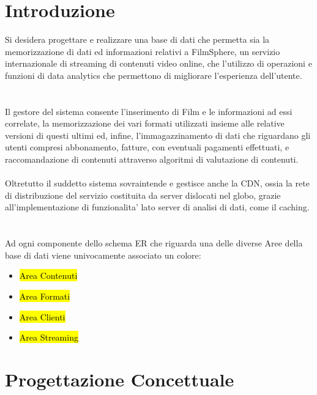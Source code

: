 \documentclass{article}
\begin{document}
\section{Introduzione} 
Si desidera progettare e realizzare una base di dati che permetta sia la memorizzazione di dati ed informazioni relativi a FilmSphere, un servizio internazionale di streaming di contenuti video online, che l'utilizzo di operazioni e funzioni di data analytics che permettono di migliorare l'esperienza dell'utente. \\ \\ \\
Il gestore del sistema consente l'inserimento di Film e le informazioni ad essi correlate, la memorizzazione dei vari formati utilizzati insieme alle relative versioni di questi ultimi ed, infine, l'immagazzinamento di dati che riguardano gli utenti compresi abbonamento, fatture, con eventuali pagamenti effettuati, e raccomandazione di contenuti attraverso algoritmi di valutazione di contenuti.  \\ \\
Oltretutto il suddetto sistema sovraintende e gestisce anche la CDN, ossia la rete di distribuzione del servizio costituita da server dislocati nel globo, grazie all'implementazione di funzionalita' lato server di analisi di dati, come il caching. \\ \\ \\
Ad ogni componente dello schema ER che riguarda una delle diverse Aree della base di dati viene univocamente associato un colore: \\
\begin{itemize}
  \item {}\hl{Area Contenuti}
  \item {}\hl{Area Formati}
  \item {}\hl{Area Clienti} 
  \item {}\hl{Area Streaming}
\end{itemize}
%
%
%
%
%
%
%
%
\section{Progettazione Concettuale}
\end{document}
